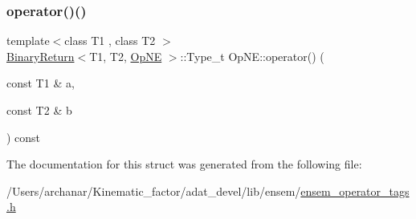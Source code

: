 \mbox{\label{structOpNE_ae32186e8a2a30c388bbe8af0eea8e4c2}} 
\subsubsection{\texorpdfstring{operator()()}{operator()()}\hspace{0.1cm}{\footnotesize\ttfamily [2/2]}}
{\footnotesize\ttfamily template$<$class T1 , class T2 $>$ \\
\mbox{\hyperlink{structBinaryReturn}{Binary\+Return}}$<$T1, T2, \mbox{\hyperlink{structOpNE}{Op\+NE}} $>$\+::Type\+\_\+t Op\+N\+E\+::operator() (\begin{DoxyParamCaption}\item[{const T1 \&}]{a,  }\item[{const T2 \&}]{b }\end{DoxyParamCaption}) const\hspace{0.3cm}{\ttfamily [inline]}}



The documentation for this struct was generated from the following file\+:\begin{DoxyCompactItemize}
\item 
/\+Users/archanar/\+Kinematic\+\_\+factor/adat\+\_\+devel/lib/ensem/\mbox{\hyperlink{lib_2ensem_2ensem__operator__tags_8h}{ensem\+\_\+operator\+\_\+tags.\+h}}\end{DoxyCompactItemize}
